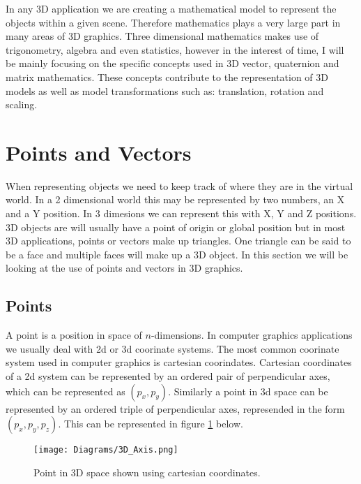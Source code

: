 In any 3D application we are creating a mathematical model to represent the objects within a given scene. Therefore mathematics plays a very large part in many areas of 3D graphics. Three dimensional mathematics makes use of trigonometry, algebra and even statistics, however in the interest of time, I will be mainly focusing on the specific concepts used in 3D vector, quaternion and matrix mathematics. These concepts contribute to the representation of 3D models as well as model transformations such as: translation, rotation and scaling.  

\section{Points and Vectors}

When representing objects we need to keep track of where they are in the virtual world. In a 2 dimensional world this may be represented by two numbers, an X and a Y position. In 3 dimesions we can represent this with X, Y and Z positions. 3D objects are will usually have a point of origin or global position but in most 3D applications, points or vectors make up triangles. One triangle can be said to be a face and multiple faces will make up a 3D object. In this section we will be looking at the use of points and vectors in 3D graphics.

\subsection{Points} 

A point is a position in space of $n$-dimensions. In computer graphics applications we usually deal with \acrshort{2d} or \acrshort{3d} coorinate systems. The most common coorinate system used in computer graphics is cartesian coorindates. Cartesian coordinates of a \acrshort{2d} system can be represented by an ordered pair of perpendicular axes, which can be represented as $(p_x, p_y)$. Similarly a point in \acrshort{3d} space can be represented by an ordered triple of perpendicular axes, represended in the form $(p_x, p_y, p_z)$. This can be represented in figure \ref{3DAxisFigure} below.

\begin{figure}[htbp]
	\raggedright
	{\centering
		\vspace{7px}
		\texttt{[image: Diagrams/3D\_Axis.png]}
		\caption{Point in 3D space shown using cartesian coordinates.}
		\label{3DAxisFigure}
	}
\end{figure}
\FloatBarrier

